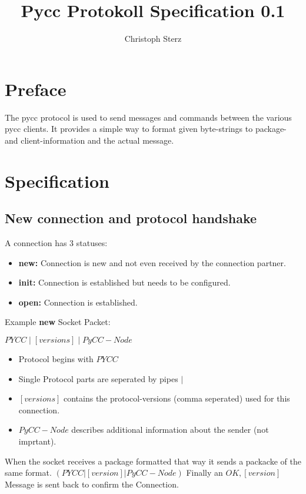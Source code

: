 \documentclass{scrartcl}
\title{Pycc Protokoll Specification 0.1}
\author{Christoph Sterz}
\begin{document}
	\section{Preface}
	The pycc protocol is used to send messages and commands between the various pycc clients. It provides a simple way to format given 
	byte-strings to package- and client-information and the actual message.

	\section{Specification}
	\subsection{New connection and protocol handshake}
	A connection has 3 statuses:
	\begin{itemize}
		\item \textbf{new:} \quad Connection is new and not even received by the connection partner.
		\item \textbf{init:} \quad	Connection is established but needs to be configured.
		\item \textbf{open:} \quad	Connection is established.
	\end{itemize}
	
	Example \textbf{new} Socket Packet:	\begin{center}{$PYCC \mid [versions] \mid PyCC-Node$}\end{center}
	\begin{itemize}
		\item	Protocol begins with \quad $PYCC$
		\item	Single Protocol parts are seperated by pipes \quad $\mid$
		\item	$[versions]$ contains the protocol-versions (comma seperated)  used for this connection.
		\item $PyCC-Node$ describes additional information about the sender (not imprtant).
	\end{itemize}

	When the socket receives a package formatted that way it sends a packacke of the same format. $(PYCC|[version]|PyCC-Node)$
	Finally an $OK,[version]$ Message is sent back to confirm the Connection. 

	\newpage
\end{document}
